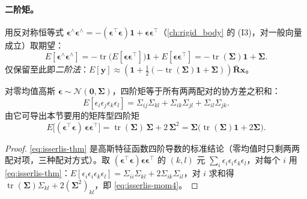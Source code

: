 \paragraph{二阶矩。}用反对称恒等式 $\boldsymbol{\epsilon}^\wedge\boldsymbol{\epsilon}^\wedge=-(\boldsymbol{\epsilon}^\top\boldsymbol{\epsilon})\mathbf{1}+\boldsymbol{\epsilon}\boldsymbol{\epsilon}^\top$（\cref{ch:rigid_body} 的 (I3)，对一般向量成立）取期望：
\begin{equation}
  E[\boldsymbol{\epsilon}^\wedge\boldsymbol{\epsilon}^\wedge]=-\operatorname{tr}\!\big(E[\boldsymbol{\epsilon}\boldsymbol{\epsilon}^\top]\big)\mathbf{1}+E[\boldsymbol{\epsilon}\boldsymbol{\epsilon}^\top]=-\operatorname{tr}(\boldsymbol{\Sigma})\mathbf{1}+\boldsymbol{\Sigma}.
  \label{eq:isserlis-2}
\end{equation}
仅保留至此即\emph{二阶法}：$E[\mathbf{y}]\approx(\mathbf{1}+\tfrac12(-\operatorname{tr}(\boldsymbol{\Sigma})\mathbf{1}+\boldsymbol{\Sigma}))\bar{\mathbf{R}}\mathbf{x}$。

\begin{theorem}\label{thm:isserlis}
对零均值高斯 $\boldsymbol{\epsilon}\sim\mathcal{N}(\mathbf{0},\boldsymbol{\Sigma})$，四阶矩等于所有两两配对的协方差之积和：
\begin{equation}
  E[\epsilon_i\epsilon_j\epsilon_k\epsilon_l]=\Sigma_{ij}\Sigma_{kl}+\Sigma_{ik}\Sigma_{jl}+\Sigma_{il}\Sigma_{jk}.
  \label{eq:isserlis-thm}
\end{equation}
由它可导出本节要用的矩阵型四阶矩
\begin{equation}
  E\big[(\boldsymbol{\epsilon}^\top\boldsymbol{\epsilon})\,\boldsymbol{\epsilon}\boldsymbol{\epsilon}^\top\big]=\operatorname{tr}(\boldsymbol{\Sigma})\,\boldsymbol{\Sigma}+2\,\boldsymbol{\Sigma}^2
  =\boldsymbol{\Sigma}\big(\operatorname{tr}(\boldsymbol{\Sigma})\mathbf{1}+2\boldsymbol{\Sigma}\big).
  \label{eq:isserlis-mom4}
\end{equation}
\end{theorem}
\begin{proof}
\cref{eq:isserlis-thm} 是高斯特征函数四阶导数的标准结论（零均值时只剩两两配对项，三种配对方式）。取 $(\boldsymbol{\epsilon}^\top\boldsymbol{\epsilon})\boldsymbol{\epsilon}\boldsymbol{\epsilon}^\top$ 的 $(k,l)$ 元 $\sum_i\epsilon_i\epsilon_i\epsilon_k\epsilon_l$，对每个 $i$ 用 \cref{eq:isserlis-thm}：$E[\epsilon_i\epsilon_i\epsilon_k\epsilon_l]=\Sigma_{ii}\Sigma_{kl}+2\Sigma_{ik}\Sigma_{il}$，对 $i$ 求和得 $\operatorname{tr}(\boldsymbol{\Sigma})\Sigma_{kl}+2(\boldsymbol{\Sigma}^2)_{kl}$，即 \cref{eq:isserlis-mom4}。
\end{proof}

